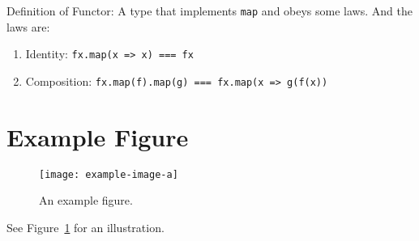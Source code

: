 \documentclass[UTF8]{ctexart}
\begin{document}
Definition of Functor:
A type that implements \texttt{map} and obeys some laws. And the laws are:
\begin{enumerate}
    \item Identity: \texttt{fx.map(x => x) === fx}
    \item Composition: \texttt{fx.map(f).map(g) === fx.map(x => g(f(x))}
\end{enumerate}

\section{Example Figure}
\begin{figure}[htbp]
    \centering
    \texttt{[image: example-image-a]} %
    \caption{An example figure.}
    \label{fig:example}
\end{figure}
See Figure~\ref{fig:example} for an illustration.
\end{document}

